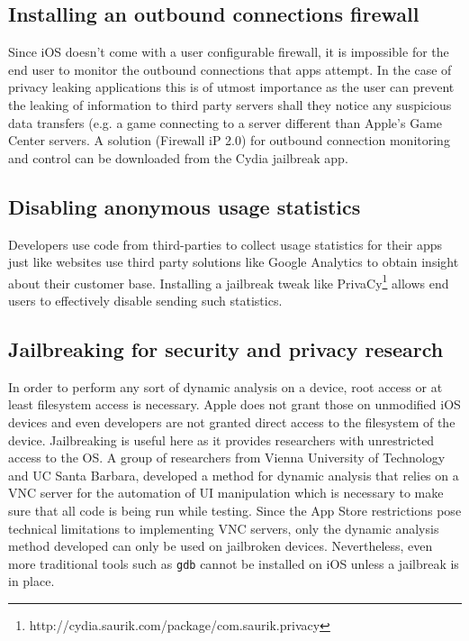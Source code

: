 \documentclass[12pt, titlepage, oneside]{article}
\begin{document}
\subsection{Installing an outbound connections firewall}
Since iOS doesn't come with a user configurable firewall, it is impossible for the end user to monitor the outbound connections that apps attempt. In the case of privacy leaking applications this is of utmost importance as the user can prevent the leaking of information to third party servers shall they notice any suspicious data transfers (e.g. a game connecting to a server different than Apple's Game Center servers. A solution (Firewall iP 2.0) for outbound connection monitoring and control can be downloaded from the Cydia jailbreak app.
\subsection{Disabling anonymous usage statistics}

Developers use code from third-parties to collect usage statistics for their apps just like websites use third party solutions like Google Analytics to obtain insight about their customer base. Installing a jailbreak tweak like PrivaCy\footnote{http://cydia.saurik.com/package/com.saurik.privacy} allows end users to effectively disable sending such statistics.

\subsection{Jailbreaking for security and privacy research}
In order to perform any sort of dynamic analysis on a device, root access or at least filesystem access is necessary. Apple does not grant those on unmodified iOS devices and even developers are not granted direct access to the filesystem of the device. Jailbreaking is useful here as it provides researchers with unrestricted access to the OS. 
A group of researchers from Vienna University of Technology and UC Santa Barbara\cite{dynamic}, developed a method for dynamic analysis that relies on a VNC server for the automation of UI manipulation which is necessary to make sure that all code is being run while testing. Since the App Store restrictions pose technical limitations to implementing VNC servers, only the dynamic analysis method developed can only be used on jailbroken devices. Nevertheless, even more traditional tools such as \texttt{gdb} cannot be installed on iOS unless a jailbreak is in place.
\end{document}
